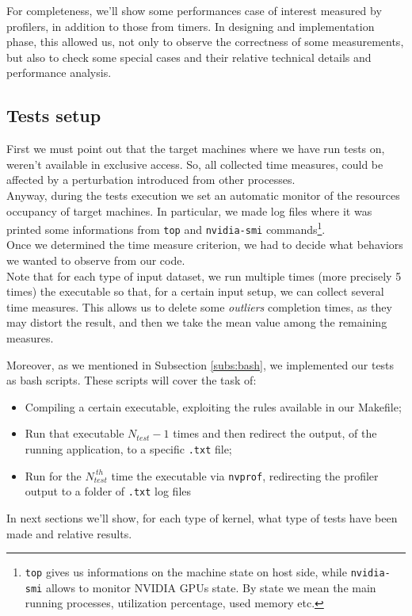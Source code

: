 For completeness, we'll show some performances case of interest measured by profilers, in addition to those from timers.
In designing and implementation phase, this allowed us, not only to observe the correctness of some measurements, but also to check some special cases and their relative technical details and performance analysis.


\subsection{Tests setup}
First we must point out that the target machines where we have run tests on, weren't available in exclusive access. So, all collected time measures, could be affected by a perturbation introduced from other processes.\\
Anyway, during the tests execution we set an automatic monitor of the resources occupancy of target machines. In particular, we made log files where it was printed some informations from \texttt{top} and \texttt{nvidia-smi} commands\footnote{\texttt{top} gives us informations on the machine state on host side, while \texttt{nvidia-smi} allows to monitor NVIDIA GPUs state. By state we mean the main running processes, utilization percentage, used memory etc.}.\\

Once we determined the time measure criterion, we had to decide what behaviors we wanted to observe from our code.\\%
Note that for each type of input dataset, we run multiple times (more precisely 5 times) the executable so that, for a certain input setup, we can collect several time measures. This allows us to delete some \textit{outliers} completion times, as they may distort the result, and then we take the mean value among the remaining measures.

Moreover, as we mentioned in Subsection \ref{subs:bash}, we implemented our tests as bash scripts.
These scripts will cover the task of:
\begin{itemize}
	\item Compiling a certain executable, exploiting the rules available in our Makefile;
	\item Run that executable \(N_{test} - 1\) times and then redirect the output, of the running application, to a specific \texttt{.txt} file;
	\item Run for the \(N_{test}^{\ th}\) time the executable via \texttt{nvprof}, redirecting the profiler output to a folder of \texttt{.txt} log files
\end{itemize} 
In next sections we'll show, for each type of kernel, what type of tests have been made and relative results.

